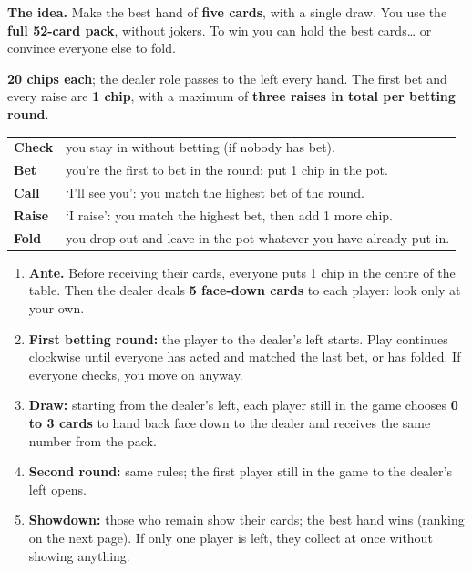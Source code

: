\documentclass[10pt]{article}
\begin{document}
\startpage\label{poker}

\textbf{The idea.} Make the best hand of \textbf{five cards}, with a single draw. You use the \textbf{full 52-card pack}, without jokers. To win you can hold the best cards… or convince everyone else to fold.

\vfill
{}
\textbf{20 chips each}; the dealer role passes to the left every hand. The first bet and every raise are \textbf{1 chip}, with a maximum of \textbf{three raises in total per betting round}.
\begingroup\renewcommand{\arraystretch}{1.15}
\begin{tabularx}{\linewidth}{@{}>{\bfseries}p{17mm}>{\raggedright\arraybackslash}X@{}}
 Check & you stay in without betting (if nobody has bet).\\
 Bet & you’re the first to bet in the round: put 1 chip in the pot.\\
 Call & ‘I’ll see you’: you match the highest bet of the round.\\
 Raise & ‘I raise’: you match the highest bet, then add 1 more chip.\\
 Fold & you drop out and leave in the pot whatever you have already put in.\\
\end{tabularx}\endgroup
{}
\begin{enumerate}
 \item \textbf{Ante.} Before receiving their cards, everyone puts 1 chip in the centre of the table. Then the dealer deals \textbf{5 face-down cards} to each player: look only at your own.
 \item \textbf{First betting round:} the player to the dealer’s left starts. Play continues clockwise until everyone has acted and matched the last bet, or has folded. If everyone checks, you move on anyway.
 \item \textbf{Draw:} starting from the dealer’s left, each player still in the game chooses \textbf{0 to 3 cards} to hand back face down to the dealer and receives the same number from the pack.
 \item \textbf{Second round:} same rules; the first player still in the game to the dealer’s left opens.
 \item \textbf{Showdown:} those who remain show their cards; the best hand wins (ranking on the next page). If only one player is left, they collect at once without showing anything.
\end{enumerate}
\end{document}
